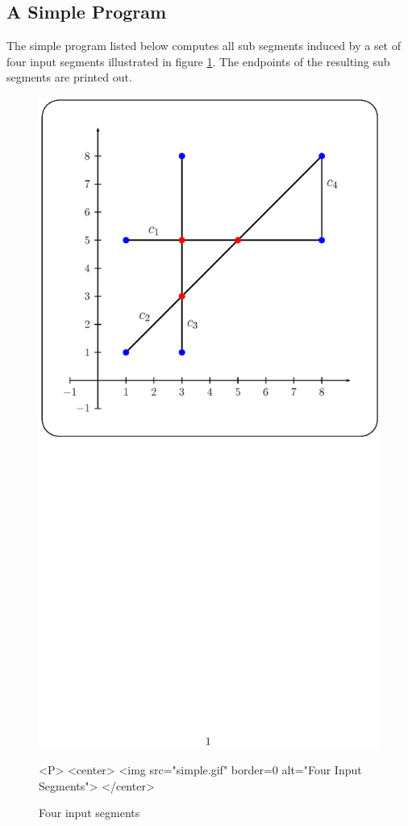 \subsection{A Simple Program}
The simple program listed below computes all sub segments induced by 
a set of four input segments illustrated in figure \ref{SL_sec:simple}.
The endpoints of the resulting sub segments are printed out.

\begin{figure}[hbp]
\begin{ccTexOnly}
\centerline{\includegraphics{sl_simple.ps}}
\end{ccTexOnly}

\caption{Four input segments
\label{SL_sec:simple}}

\begin{ccHtmlOnly}
<P>
<center>
  <img src="simple.gif" border=0 alt="Four Input Segments">
</center>
\end{ccHtmlOnly}
\end{figure}


